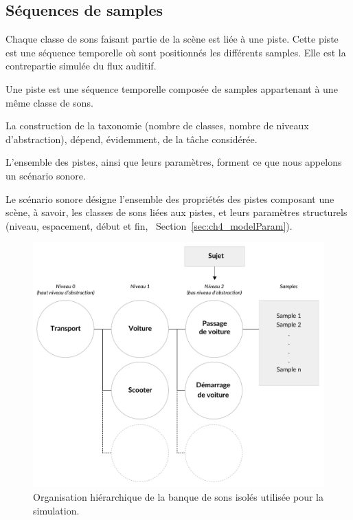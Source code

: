 \subsection{Séquences de samples}
\label{sec:ch4_seqSample}

Chaque classe de sons faisant partie de la scène est liée à une piste. Cette piste est une séquence temporelle où sont positionnés les différents samples. Elle est la contrepartie simulée du flux auditif.

\begin{mydef}
Une piste est une séquence temporelle composée de samples appartenant à une même classe de sons.
\end{mydef}

La construction de la taxonomie (nombre de classes, nombre de niveaux d'abstraction), dépend, évidemment, de la tâche considérée. 

L'ensemble des pistes, ainsi que leurs paramètres, forment ce que nous appelons un scénario sonore.

\begin{mydef}
Le scénario sonore désigne l'ensemble des propriétés des pistes composant une scène, à savoir, les classes de sons liées aux pistes, et leurs paramètres structurels (niveau, espacement, début et fin, \cf~Section~\ref{sec:ch4_modelParam}).
\end{mydef}

\begin{figure}[t]
        \myfloatalign
        \includegraphics[width=.8\linewidth]{gfx/ch_4/3}
       \caption{Organisation hiérarchique de la banque de sons isolés utilisée pour la simulation.}\label{fig:orgDb}
\end{figure}

